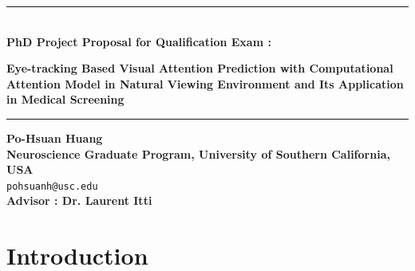\documentclass[a4paper, times, 12pt, ,onecolumn,oneside,top=1.0cm,bottom=1.0cm,left=1.0 cm,right=1cm]{article}
\begin{document}



\renewcommand\maketitle{
        \begin{center}
            \thispagestyle{plain}
            \noindent\rule{\textwidth}{3pt}\\
            \vspace*{0.2 in}
            \textbf{\LARGE  PhD Project Proposal for Qualification Exam : }\par
            \vspace*{0.5 in}
            \textbf{\large Eye-tracking Based Visual Attention Prediction with Computational Attention Model in Natural Viewing Environment and Its Application in Medical Screening}
           \vspace*{0.2 in}
            \noindent\rule{\textwidth}{1 pt}
            \textbf{\normalsize Po-Hsuan Huang}\\
            \vspace*{ 0.05 in}
            \textbf{\small Neuroscience Graduate Program, University of Southern California, USA}\\
            \vspace*{0.05 in}
            \texttt{\normalsize pohsuanh@usc.edu}\\
            \vspace*{0.1 in}
            \textbf{\normalsize Advisor :  Dr. Laurent Itti}

            
        \end{center}
    }
\maketitle
\tableofcontents


\section{Introduction}
\end{document}
